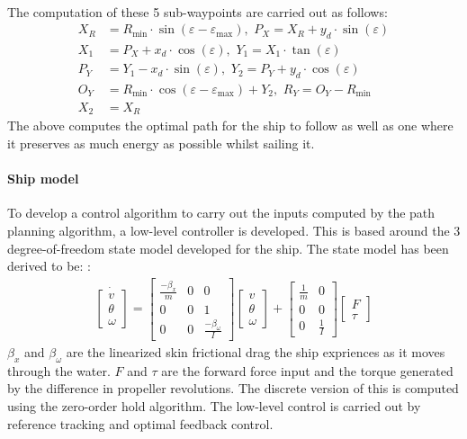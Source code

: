 \documentclass[a0,portrait]{a0poster}
\begin{document}
\begin{center}
{\paragraph{}
The computation of these 5 sub-waypoints are carried out as follows:
\begin{align}
X_R &= R_\text{min} \cdot \sin(\varepsilon - \varepsilon _\text{max}),\,\, P_X = X_R + y_d \cdot \sin(\varepsilon)\\
X_1 &= P_X + x_d \cdot \cos(\varepsilon),\,\, Y_1 = X_1 \cdot \tan(\varepsilon)\\
P_Y &= Y_1 - x_d \cdot \sin(\varepsilon),\,\, Y_2 = P_Y + y_d \cdot \cos(\varepsilon)\\
O_Y &= R_\text{min} \cdot \cos(\varepsilon - \varepsilon _\text{max}) + Y_2,\,\, R_Y = O_Y - R_\text{min}\\
X_2 &= X_R
\end{align}
The above computes the optimal path for the ship to follow as well as one where it preserves as much energy as possible whilst sailing it. 

\paragraph{Ship model}
To develop a control algorithm to carry out the inputs computed by the path planning algorithm, a low-level controller is developed. This is based around the 3 degree-of-freedom state model developed for the ship. The state model has been derived to be: \cite{sorensen}:
\begin{align}
\dot{\begin{bmatrix}
v\\
\theta\\
\omega
\end{bmatrix}} = \begin{bmatrix}
\frac{-\beta_x}{m} & 0 & 0\\
0 & 0 & 1\\
0 & 0 & \frac{-\beta_\omega}{I}
\end{bmatrix}\begin{bmatrix}
v\\
\theta\\
\omega
\end{bmatrix} + \begin{bmatrix}
\frac{1}{m} & 0\\
0 & 0\\
0 & \frac{1}{I}
\end{bmatrix}\begin{bmatrix}
F\\
\tau
\end{bmatrix}
\end{align}
$\beta_x$ and $\beta_\omega$ are the linearized skin frictional drag the ship expriences as it moves through the water. $F$ and $\tau$ are the forward force input and the torque generated by the difference in propeller revolutions. The discrete version of this is computed using the zero-order hold algorithm. The low-level control is carried out by reference tracking and optimal feedback control. 

}
\end{center}
\end{document}
